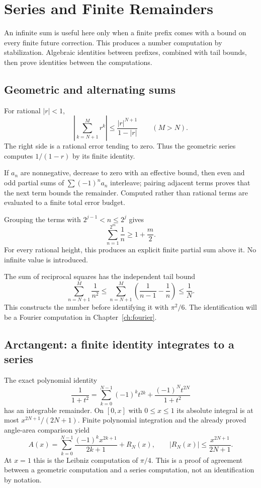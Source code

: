 \chapter{Series and Finite Remainders}\label{ch:infinite-series}

An infinite sum is useful here only when a finite prefix comes with a
bound on every finite future correction.  This produces a number
computation by stabilization.  Algebraic identities between prefixes,
combined with tail bounds, then prove identities between the computations.

\section{Geometric and alternating sums}
\label{thm:finite-geometric-series-interface}
For rational $|r|<1$,
\[
 \left|\sum_{k=N+1}^{M}r^k\right|
       \le\frac{|r|^{N+1}}{1-|r|}\qquad(M>N).
\]
The right side is a rational error tending to zero.  Thus the geometric
series computes $1/(1-r)$ by its finite identity.

If $a_n$ are nonnegative, decrease to zero with an effective bound, then
even and odd partial sums of $\sum(-1)^na_n$ interleave; pairing adjacent
terms proves that the next term bounds the remainder.  Computed rather
than rational terms are evaluated to a finite total error budget.

\begin{example}
\label{thm:harmonic-dyadic-lower-bound}
Grouping the terms with $2^{j-1}<n\le2^j$ gives
\[
 \sum_{n=1}^{2^m}\frac1n\ge1+\frac m2.
\]
For every rational height, this produces an explicit finite partial sum
above it.  No infinite value is introduced.
\end{example}

The sum of reciprocal squares has the independent tail bound
\[
 \sum_{n=N+1}^{M}\frac1{n^2}
 \le\sum_{n=N+1}^{M}\left(\frac1{n-1}-\frac1n\right)\le\frac1N.
\]
This constructs the number before identifying it with $\pi^2/6$.
The identification will be a Fourier computation in
Chapter~\ref{ch:fourier}.

\section{Arctangent: a finite identity integrates to a series}
\label{thm:leibniz-arctan}
The exact polynomial identity
\[
 \frac1{1+t^2}=\sum_{k=0}^{N-1}(-1)^kt^{2k}
              +\frac{(-1)^Nt^{2N}}{1+t^2}
\]
has an integrable remainder.  On $[0,x]$ with $0\le x\le1$ its
absolute integral is at most $x^{2N+1}/(2N+1)$.  Finite polynomial
integration and the already proved angle-area comparison yield
\[
 A(x)=\sum_{k=0}^{N-1}\frac{(-1)^kx^{2k+1}}{2k+1}+R_N(x),
 \qquad |R_N(x)|\le\frac{x^{2N+1}}{2N+1}.
\]
At $x=1$ this is the Leibniz computation of $\pi/4$.  This is a proof of
agreement between a geometric computation and a series computation, not
an identification by notation.

